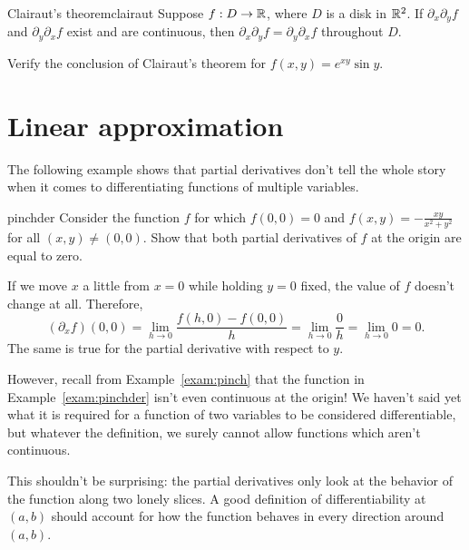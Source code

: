 \documentclass[svgnames]{report}
\begin{document}
\begin{theo}{Clairaut's theorem}{clairaut}
  Suppose $f:D \to \mathbb{R}$, where $D$ is a disk in $\mathbb{R}^2$. If
  $\partial_x \partial_y f$ and $\partial_y \partial_x f$ exist and
  are continuous, then $\partial_x \partial_y f = \partial_y
  \partial_x f$ throughout $D$. 
\end{theo}

\begin{exercise}{}{}
  Verify the conclusion of Clairaut's theorem for $f(x,y) = e^{xy}
  \sin y$. 
\end{exercise}

\section{Linear approximation}


The following example shows that partial derivatives don't tell the
whole story when it comes to differentiating functions of multiple
variables.

\begin{example}{}{pinchder}
  Consider the function $f$ for which $f(0,0)=0$ and $f(x,y) =
  -\frac{xy}{x^2 + y^2}$ for all $(x,y) \neq (0,0)$. Show that both
  partial derivatives of $f$ at the origin are equal to zero. 
  \end{example}

  \begin{solution}
    If we move $x$ a little from $x=0$ while holding $y=0$ fixed, the
    value of $f$ doesn't change at all. Therefore,
    \[
      (\partial_x f)(0,0) = \lim_{h \to 0} \frac{f(h,0) - f(0,0)}{h} =
      \lim_{h \to 0} \frac{0}{h} =  \lim_{h \to 0} 0 = 0. 
    \]
    The same is true for the partial derivative with respect to $y$. 
  \end{solution}

  However, recall from Example~\ref{exam:pinch} that the function in
  Example~\ref{exam:pinchder} isn't even continuous at the origin! We
  haven't said yet what it is required for a function of two variables to be
  considered differentiable, but whatever the definition, we surely cannot allow
  functions which aren't continuous. 

  This shouldn't be surprising: the partial derivatives only look at
  the behavior of the function along two lonely slices. A good
  definition of differentiability at $(a,b)$ should account for how the
  function behaves in every direction around $(a,b)$.
\end{document}

